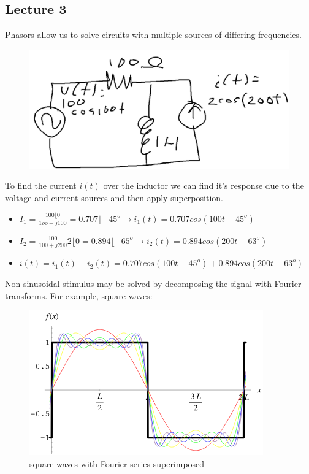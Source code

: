 \documentclass[10pt]{article}
\begin{document}
\subsection{Lecture 3}

Phasors allow us to solve circuits with multiple sources of differing frequencies.



\begin{figure}[H]
	\centering
	\includegraphics[width=0.8\linewidth]{img/image_2022-09-12-11-19-00.png}
\end{figure}

To find the current $ i(t) $ over the inductor we can find it's response due to the voltage and current sources and then apply superposition.

\begin{itemize}
	\item $ I_1 = \frac{100\lfloor{0}}{1oo + j100} = 0.707\lfloor{-45^o} \rightarrow i_1(t) = 0.707 cos(100t - 45^o) $ 
	\item $ I_2 = \frac{100}{100 + j200} 2\lfloor 0 = 0.894 \lfloor -65^o \rightarrow i_2(t) = 0.894 cos (200t - 63^o)$ 
	\item $ i(t) = i_1(t) + i_2(t) = 0.707cos(100t - 45^o) + 0.894 cos(200t - 63^o) $ 
\end{itemize}

Non-sinusoidal stimulus may be solved by decomposing the signal with Fourier transforms. 
For example, square waves:

\begin{figure}[H]
	\centering
	\includegraphics[width=0.8\linewidth]{img/image_2022-09-12-11-28-11.png}
	\caption{square waves with Fourier series superimposed}
\end{figure}
\end{document}
